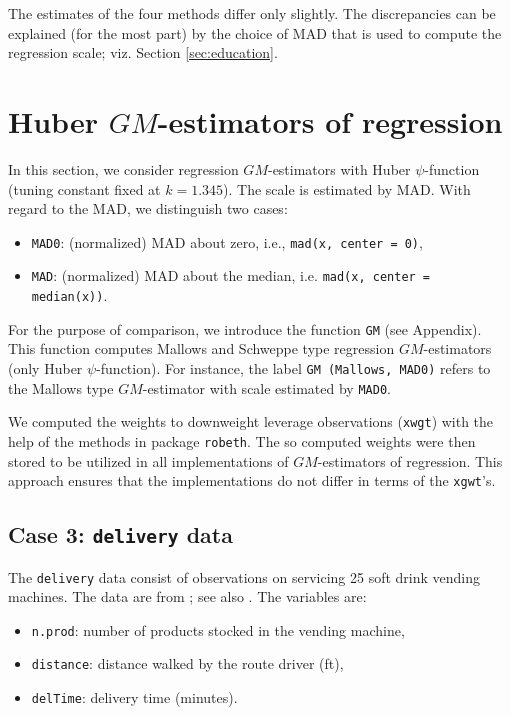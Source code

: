 \documentclass[a4paper]{scrartcl}
\begin{document}
\noindent The estimates of the four methods differ only slightly. The discrepancies can be explained (for the most part) by the choice of MAD that is used to compute the regression scale; viz. Section \ref{sec:education}. 


\section{Huber $GM$-estimators of regression}\label{sec:gmest}
In this section, we consider regression $GM$-estimators with Huber $\psi$-function (tuning constant fixed at $k=1.345$). The scale is estimated by MAD. With regard to the MAD, we distinguish two cases: 
\begin{itemize}
   \item \texttt{MAD0}: (normalized) MAD about zero, i.e., \texttt{mad(x, center = 0)},
   \item \texttt{MAD}: (normalized) MAD about the median, i.e. \texttt{mad(x, center = median(x))}.
\end{itemize}

\noindent For the purpose of comparison, we introduce the function \texttt{GM} (see Appendix). This function computes Mallows and Schweppe type regression $GM$-estimators (only Huber $\psi$-function). For instance, the label \texttt{GM (Mallows, MAD0)} refers to the Mallows type $GM$-estimator with scale estimated by \texttt{MAD0}. 

We computed the weights to downweight leverage observations (\texttt{xwgt}) with the help of the methods in package \texttt{robeth}. The so computed weights were then stored to be utilized in all implementations of $GM$-estimators of regression. This approach ensures that the implementations do not differ in terms of the \texttt{xgwt}'s. 

\subsection{Case 3: \texttt{delivery} data}
The \texttt{delivery} data consist of observations on servicing 25 soft drink vending machines. The data are from \cite{montgomerypeck}; see also \cite{rousseeuwleroy}. The variables are:

\begin{itemize}
   \item \texttt{n.prod}: number of products stocked in the vending machine,
   \item \texttt{distance}: distance walked by the route driver (ft), 
   \item \texttt{delTime}: delivery time (minutes).
\end{itemize}
\end{document}
